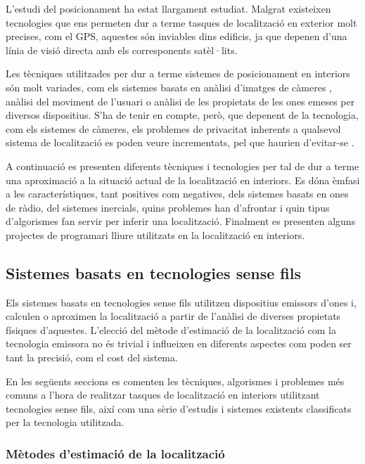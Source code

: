 
L’estudi del posicionament ha estat llargament estudiat. Malgrat existeixen tecnologies que ens permeten dur a terme tasques de localització en exterior molt precises, com el GPS, aquestes són inviables dins edificis, ja que depenen d’una línia de visió directa amb els corresponents satèl·lits.

Les tècniques utilitzades per dur a terme sistemes de posicionament en interiors són molt variades, com els  sistemes basats en anàlisi d’imatges de càmeres \cite{martinez} \cite{mulloni}, anàlisi del moviment de l’usuari o anàlisi de les propietats de les ones emeses per diversos dispositius. S’ha de tenir en compte, però, que depenent de la tecnologia, com els sistemes de càmeres, els problemes de privacitat inherents a qualsevol sistema de localització es poden veure incrementats, pel que haurien d’evitar-se \cite{garcia}.

A continuació es presenten diferents tècniques i tecnologies per tal de dur a terme una aproximació a la situació actual de la localització en interiors. Es dóna èmfasi a les característiques, tant positives com negatives, dels sistemes basats en ones de ràdio, del sistemes inercials, quins problemes han d’afrontar i quin tipus d’algorismes fan servir per inferir una localització. Finalment es presenten alguns projectes de programari lliure utilitzats en la localització en interiors.

\subsection{Sistemes basats en tecnologies sense fils}

Els sistemes basats en tecnologies sense fils utilitzen dispositius emissors d'ones i, calculen o aproximen la localització a partir de l'anàlisi de diverses propietats físiques d'aquestes. L'elecció del mètode d'estimació de la localització com la tecnologia emissora no és trivial i influeixen en diferents aspectes com poden ser tant la precisió, com el cost del sistema.

En les següents seccions es comenten les tècniques, algorismes i problemes més comuns a l'hora de realitzar tasques de localització en interiors utilitzant tecnologies sense fils, així com una sèrie d'estudis i sistemes existents classificats per la tecnologia utilitzada. 

\subsubsection{Mètodes d’estimació de la localització}

